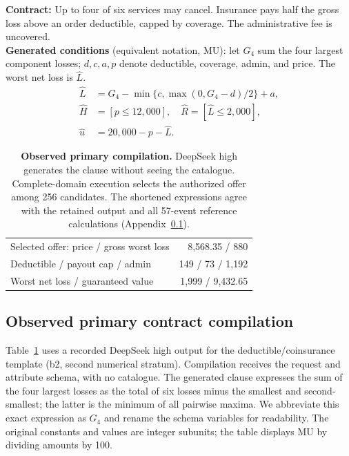 \begin{table}[t]
\centering\small
\begin{minipage}{\columnwidth}
\textbf{Contract:} Up to four of six services may cancel. Insurance pays half the gross loss above an order deductible, capped by coverage. The administrative fee is uncovered.\\[3pt]
\textbf{Generated conditions} (equivalent notation, MU): let $G_4$ sum the four largest component losses; $d,c,a,p$ denote deductible, coverage, admin, and price. The worst net loss is $\widehat L$.
\[
\begin{aligned}
\widehat L&=G_4-\min\{c,\max(0,G_4-d)/2\}+a,\\
\widehat H&=[p\le12{,}000],\quad
\widehat R=[\widehat L\le2{,}000],\\
\widehat u&=20{,}000-p-\widehat L.
\end{aligned}
\]
\end{minipage}
\begin{tabular}{@{}lr@{}}
\toprule
Selected offer: price / gross worst loss & 8,568.35 / 880\\
Deductible / payout cap / admin & 149 / 73 / 1,192\\
Worst net loss / guaranteed value & 1,999 / 9,432.65\\
\bottomrule
\end{tabular}
\caption{\textbf{Observed primary compilation.} DeepSeek high generates the clause without seeing the catalogue. Complete-domain execution selects the authorized offer among 256 candidates. The shortened expressions agree with the retained output and all 57-event reference calculations (Appendix~\ref{app:primary-trace}).}
\label{tab:primary-trace}
\end{table}

\subsection{Observed primary contract compilation}
\label{app:primary-trace}
Table~\ref{tab:primary-trace} uses a recorded DeepSeek high output for the deductible/coinsurance template (b2, second numerical stratum). Compilation receives the request and attribute schema, with no catalogue. The generated clause expresses the sum of the four largest losses as the total of six losses minus the smallest and second-smallest; the latter is the minimum of all pairwise maxima. We abbreviate this exact expression as $G_4$ and rename the schema variables for readability. The original constants and values are integer subunits; the table displays MU by dividing amounts by 100.

